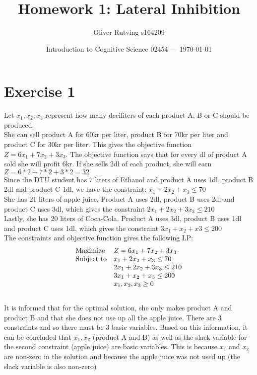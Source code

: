 \documentclass{article}
\title{Homework 1: Lateral Inhibition} %
\author{Oliver Rutving s164209} %
\date{Introduction to Cognitive Science 02454 --- \today} %
\begin{document}
\maketitle %


\section{Exercise 1} %
Let $x_1, x_2, x_3$ represent how many deciliters of each product A, B or C should be produced. 
\\
She can sell product A for 60kr per liter, product B for 70kr per liter and product C for 30kr per liter. This gives the objective function $Z=6x_1+7x_2+3x_3$. 
The objective function says that for every dl of product A sold she will profit 6kr. If she sells 2dl of each product, she will earn $Z=6*2+7*2+3*2=32$
\\
Since the DTU student has 7 liters of Ethanol and product A uses 1dl, product B 2dl and product C 1dl, we have the constraint: $x_1+2x_2+x_3\leq 70$
\\
She has 21 liters of apple juice. Product A uses 2dl, product B uses 2dl and product C uses 3dl, which gives the constraint $2x_1+2x_2+3x_3\leq 210$
\\
Lastly, she has 20 liters of Coca-Cola. Product A uses 3dl, product B uses 1dl and product C uses 1dl, which gives the constraint $3x_1+x_2+x3\leq 200$
\\
The constraints and objective function gives the following LP:
\\
\begin{equation*}
    \begin{array}{ll@{}ll}
    \text{Maximize}  & Z=6x_1+7x_2+3x_3 &\\
    \text{Subject to}& x_1+2x_2+x_3\leq 70\\
                     & 2x_1+2x_2+3x_3\leq 210\\
                     & 3x_1+x_2+x_3\leq 200\\
                     & x_1, x_2, x_3 \geq 0
\end{array}
\end{equation*}
\\
It is informed that for the optimal solution, she only makes product A and product B and that she does not use up all the apple juice.
There are 3 constraints and so there must be 3 basic variables.
Based on this information, it can be concluded that $x_1, x_2$ (product A and B) as well as the slack variable for the second constraint (apple juice) are basic variables. 
This is because $x_1$ and $x_2$ are non-zero in the solution and because the apple juice was not used up (the slack variable is also non-zero)
\end{document}
